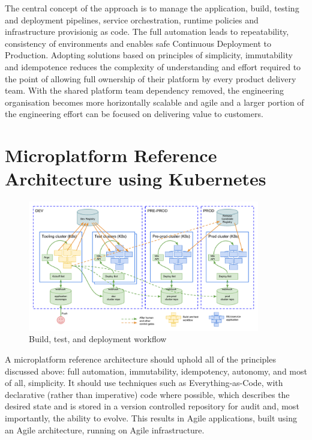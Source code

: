\documentclass[reprint,amsmath,amssymb,aps]{revtex4-1}
\begin{document}
The central concept of the approach is to manage the application, build, testing and deployment pipelines, service orchestration, runtime policies and infrastructure provisionig as code. The full automation leads to repeatability, consistency of environments and enables safe Continuous Deployment to Production. Adopting solutions based on principles of simplicity, immutability and idempotence reduces the complexity of understanding and effort required to the point of allowing full ownership of their platform by every product delivery team. With the shared platform team dependency removed, the engineering organisation becomes more horizontally scalable and agile and a larger portion of the engineering effort can be focused on delivering value to customers.

\newpage
\clearpage

\appendix
\section{\label{sec:architecture}Microplatform Reference Architecture using Kubernetes}

\begin{figure}[t!]
  \includegraphics[width=0.9\textwidth]{figs/workflow}
	\caption{Build, test, and deployment workflow}
	\label{fig:workflow}
\end{figure}

A microplatform reference architecture should uphold all of the principles discussed above: full automation, immutability, idempotency, autonomy, and most of all, simplicity. It should use techniques such as Everything-as-Code, with declarative (rather than imperative) code where possible, which describes the desired state and is stored in a version controlled repository for audit and, most importantly, the ability to evolve. This results in Agile applications, built using an Agile architecture, running on Agile infrastructure.
\end{document}
